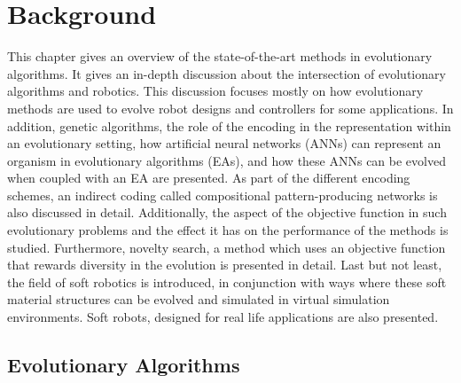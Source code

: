 
\chapter{Background} %

\label{Background} %


This chapter gives an overview of the state-of-the-art methods in evolutionary algorithms. It gives an in-depth discussion about the intersection of evolutionary algorithms and robotics. This discussion focuses mostly on how evolutionary methods are used to evolve robot designs and controllers for some applications. In addition, genetic algorithms, the role of the encoding in the representation within an evolutionary setting,  how artificial neural networks (ANNs) can represent an organism in evolutionary algorithms (EAs), and how these ANNs can be evolved when coupled with an EA are presented. As part of the different encoding schemes, an indirect coding called compositional pattern-producing networks is also discussed in detail. Additionally, the aspect of the objective function in such evolutionary problems and the effect it has on the performance of the methods is studied. Furthermore, novelty search, a method which uses an objective function that rewards diversity in the evolution is presented in detail. Last but not least, the field of soft robotics  is introduced, in conjunction with ways where these soft material structures can be evolved and simulated in virtual simulation environments. Soft robots, designed for real life applications are also presented.




\section{Evolutionary Algorithms}

